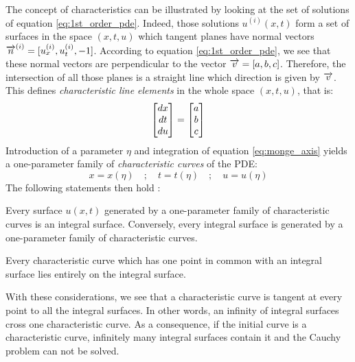 The concept of characteristics can be illustrated by looking at the set of solutions of equation \eqref{eq:1st_order_pde}. Indeed, those solutions $u^{(i)}(x,t)$ form a set of surfaces in the space $(x,t,u)$ which tangent planes have normal vectors ${\overrightarrow{n}}^{(i)}=[u^{(i)}_x,u^{(i)}_t,-1]$. According to equation \eqref{eq:1st_order_pde}, we see that these normal vectors are perpendicular to the vector ${\overrightarrow{v}}=[a,b,c]$. Therefore, the intersection of all those planes is a straight line which direction is given by ${\overrightarrow{v}}$. This defines \textit{characteristic line elements} in the whole space $(x,t,u)$, that is:
\begin{equation}
  \label{eq:monge_axis}
  \left[\begin{matrix}dx \\ dt \\ du\end{matrix}\right] = \left[\begin{matrix}a \\ b \\c\end{matrix}\right]
\end{equation}
Introduction of a parameter $\eta$ and integration of equation \eqref{eq:monge_axis} yields a one-parameter family of \textit{characteristic curves} of the PDE:
\begin{equation*}
  x=x(\eta) \quad ; \quad t=t(\eta) \quad ; \quad u=u(\eta)
\end{equation*}
The following statements then hold \cite[Chapter~1]{Courant}:
\begin{theorem}
  \label{th:integral_surface_generated}
  Every surface $u(x,t)$ generated by a one-parameter family of characteristic curves is an integral surface. Conversely, every integral surface is generated by a one-parameter family of characteristic curves.
\end{theorem}
\begin{theorem}
  \label{th:charac_in_integral_surface}
  Every characteristic curve which has one point in common with an integral surface lies entirely on the integral surface.
\end{theorem}
With these considerations, we see that a characteristic curve is tangent at every point to all the integral surfaces. In other words, an infinity of integral surfaces cross one characteristic curve. As a consequence, if the initial curve is a characteristic curve, infinitely many integral surfaces contain it and the Cauchy problem can not be solved.

